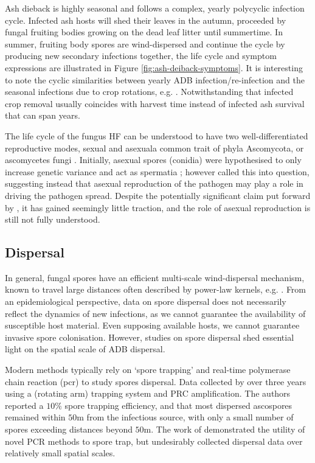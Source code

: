 Ash dieback is highly seasonal \cite{bengtsson2014seasonal} and follows a complex, yearly polycyclic infection cycle.
Infected ash hosts will shed their leaves in the autumn, proceeded by fungal fruiting bodies growing on the dead leaf litter until summertime.
In summer, fruiting body spores are wind-dispersed and continue the cycle by producing new secondary infections\textemdash 
together, the life cycle and symptom expressions are illustrated in Figure \ref{fig:ash-deiback-symptoms}.
It is interesting to note the cyclic similarities between yearly ADB infection/re-infection and the seasonal
infections due to crop rotations, e.g. \cite{tankam2020modelling}. 
Notwithstanding that infected crop removal usually coincides with harvest time instead of infected ash survival that can span years.

The life cycle of the fungus HF can be understood to have two well-differentiated reproductive modes, 
sexual and asexual\textemdash a common trait of phyla Ascomycota, or ascomycetes fungi \cite{hawker2016physiology}.
Initially, asexual spores (conidia) were hypothesised to only increase genetic variance and act as spermatia \cite{gross2014h};
however \cite{fones2016role} called this into question, suggesting instead that asexual reproduction of the pathogen 
may play a role in driving the pathogen spread. Despite the potentially significant claim put forward by \cite{fones2016role},
it has gained seemingly little traction, and the role of asexual reproduction is still not fully understood.

\subsection{Dispersal}

In general, fungal spores have an efficient multi-scale wind-dispersal mechanism,
known to travel large distances \cite{golan2017long, wingen2013long, mundt2009aerial}
often described by power-law kernels, e.g. \cite{shaw2006assembling}.
From an epidemiological perspective, data on spore dispersal does not necessarily reflect the dynamics of new infections, 
as we cannot guarantee the availability of susceptible host material.
Even supposing available hosts, we cannot guarantee invasive spore colonisation.
However, studies on spore dispersal shed essential light on the spatial scale of ADB dispersal. 

Modern methods typically rely on `spore trapping' and real-time polymerase chain reaction (\acrshort{pcr}) to study spores dispersal.
Data collected by \cite{chandelier2014detection} over three years using a (rotating arm) trapping system
and PRC amplification. The authors reported a $10\%$ spore trapping efficiency, and that most
dispersed ascospores remained within $50\mathrm{m}$ from the infectious source, with only a small number of spores exceeding 
distances beyond $50\mathrm{m}$. The work of \cite{chandelier2014detection} demonstrated the utility of novel PCR methods
to spore trap, but undesirably collected dispersal data over relatively small spatial scales.

